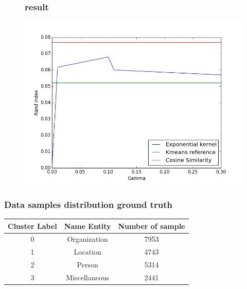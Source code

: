 \documentclass{beamer}
\begin{document}
\begin{frame}
\begin{figure}
\frametitle{result}
\includegraphics[width=0.8\linewidth]{../REPORT/Figures_Mik/results.png}  
\end{figure}
\end{frame}

\begin{frame}
\frametitle{Data samples distribution ground truth}
\begin{center}
\begin{tabular}{ |c|c|c|} 
\hline
Cluster Label & Name Entity & Number of sample\\
\hline
0 & Organization & 7953\\
 \hline
1 & Location & 4743\\
 \hline
2 & Person & 5314\\
 \hline
3 & Miscellaneous & 2441\\
 \hline
\end{tabular}
\end{center}
\end{frame}
\end{document}
